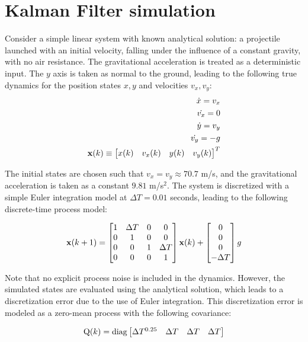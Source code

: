 \section{Kalman Filter simulation}

Consider a simple linear system with known analytical solution: a projectile launched with an initial velocity, falling under the influence of a constant gravity, with no air resistance.
The gravitational acceleration is treated as a deterministic input.
The $y$ axis is taken as normal to the ground, leading to the following true dynamics for the position states $x,y$ and velocities $v_x,v_y$:
\begin{align}
\dot{x} = v_x \\
\dot{v_x} = 0 \\
\dot{y} = v_y \\
\dot{v_y} = -g \\
\mathrm{\mathbf{x}}(k) \equiv \begin{bmatrix} x(k) & v_x(k) & y(k) & v_y(k) \end{bmatrix}^T
\end{align}

The initial states are chosen such that $v_x = v_y \approx 70.7$ m/s, and the gravitational acceleration is taken as a constant $9.81$ m/s$^2$.
The system is discretized with a simple Euler integration model at $\Delta T = 0.01$ seconds, leading to the following discrete-time process model:

\begin{equation}
\mathrm{\mathbf{x}}(k+1) = \begin{bmatrix}
1 & \Delta T & 0 & 0\\
0 & 1 & 0 & 0\\
0 & 0 & 1 & \Delta T\\
0 & 0 & 0 & 1
\end{bmatrix}\mathrm{\mathbf{x}}(k) + 
\begin{bmatrix}
0 \\ 0 \\ 0 \\ -\Delta T
\end{bmatrix} g
\end{equation}

Note that no explicit process noise is included in the dynamics.
However, the simulated states are evaluated using the analytical solution, which leads to a discretization error due to the use of Euler integration.
This discretization error is modeled as a zero-mean process with the following covariance:

\begin{equation}
\mathrm{Q}(k) = \mathrm{diag}\begin{bmatrix} \Delta T^{0.25} & \Delta T & \Delta T & \Delta T \end{bmatrix}
\end{equation}

